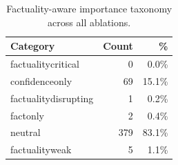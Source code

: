 \begin{table}[h]
\centering\small
\begin{tabular}{lrr}
\toprule
Category & Count & \% \\
\midrule
  factuality\-critical & 0 & 0.0\% \\
  confidence\-only & 69 & 15.1\% \\
  factuality\-disrupting & 1 & 0.2\% \\
  fact\-only & 2 & 0.4\% \\
  neutral & 379 & 83.1\% \\
  factuality\-weak & 5 & 1.1\% \\
\bottomrule
\end{tabular}
\caption{Factuality-aware importance taxonomy across all ablations.}
\label{tab:e2_taxonomy_overall}
\end{table}
